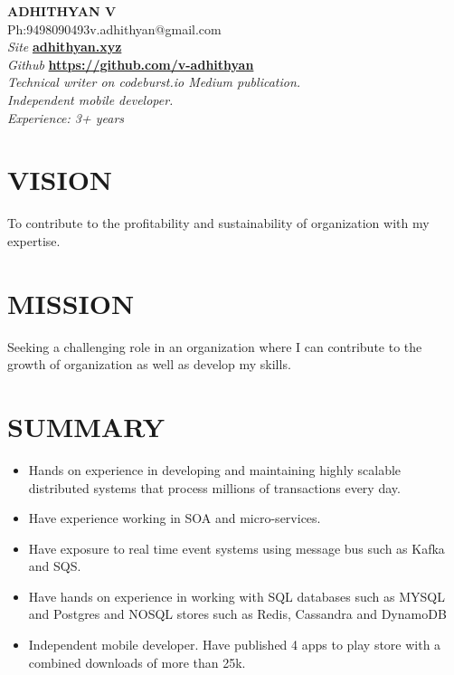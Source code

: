 \documentclass[11pt,a4paper]{article}
\begin{document}
\begin{center}
{\LARGE{\textbf{ADHITHYAN V}}}\\
{Ph:9498090493\hfill}{\hfill v.adhithyan@gmail.com} \\
\emph{Site} \textbf{\href{adhithyan.xyz}{adhithyan.xyz}} \\
\emph{Github} \textbf{\href{https://github.com/v-adhithyan}{https://github.com/v-adhithyan}}\\
\emph{Technical writer on codeburst.io Medium publication.}\\
\emph{Independent mobile developer.}\\
\emph{Experience: 3+ years}
\noindent\makebox[\linewidth]{\rule{\paperwidth}{0.4pt}}
\end{center}
\begin{multicols}{2}
\section*{VISION}
\par To contribute to the profitability and sustainability of organization with my expertise.
\section*{MISSION}
\par Seeking a challenging role in an organization where I can contribute to the growth of organization as well as develop my skills.
\end{multicols}
\section*{SUMMARY}
\begin{itemize}[noitemsep]
\item Hands on experience in developing and maintaining highly scalable distributed systems that process millions of transactions every day.
\item Have experience working in SOA and micro-services.
\item Have exposure to real time event systems using message bus such as Kafka and SQS.
\item Have hands on experience in working with SQL databases such as MYSQL and Postgres and NOSQL stores such as Redis, Cassandra and DynamoDB
\item Independent mobile developer. Have published 4 apps to play store with a combined downloads of more than 25k.
\end{itemize}
\end{document}
